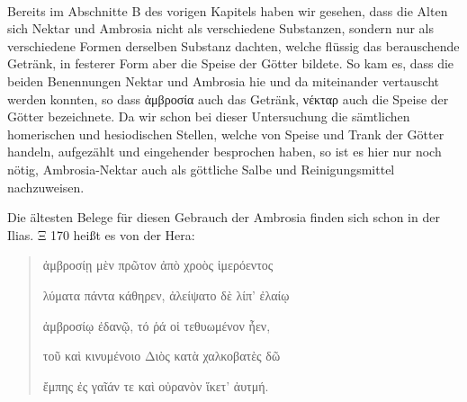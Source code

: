 \documentclass[a4paper, 11pt, oneside]{article}
\begin{document}
\paragraph{}
Bereits im Abschnitte B des vorigen Kapitels haben wir gesehen, dass die Alten sich Nektar und Ambrosia nicht als verschiedene Substanzen, sondern nur als verschiedene Formen derselben Substanz dachten, welche flüssig das berauschende Getränk, in festerer Form aber die Speise der Götter bildete. So kam es, dass die beiden Benennungen Nektar und Ambrosia hie und da miteinander vertauscht werden konnten, so dass ἀμβροσία auch das Getränk, νέκταρ auch die Speise der Götter bezeichnete. Da wir schon bei dieser Untersuchung die sämtlichen homerischen und hesiodischen Stellen, welche von Speise und Trank der Götter handeln, aufgezählt und eingehender besprochen haben, so ist es hier nur noch nötig, Ambrosia-Nektar auch als göttliche Salbe und Reinigungsmittel nachzuweisen.

Die ältesten Belege für diesen Gebrauch der Ambrosia finden sich schon in der Ilias. Ξ 170 heißt es von der Hera:
\begin{quotation}
ἀμβροσίῃ μὲν πρῶτον ἀπὸ χροὸς ἱμερόεντος

λύματα πάντα κάθηρεν, ἀλείψατο δὲ λίπ' ἐλαίῳ

ἀμβροσίῳ ἐδανῷ, τό ῥά οἱ τεθυωμένον ἦεν,

τοῦ καὶ κινυμένοιο Διὸς κατὰ χαλκοβατὲς δῶ

ἔμπης ἐς γαῖάν τε καὶ οὐρανὸν ἵκετ' ἀυτμή.
\end{quotation}
\end{document}
